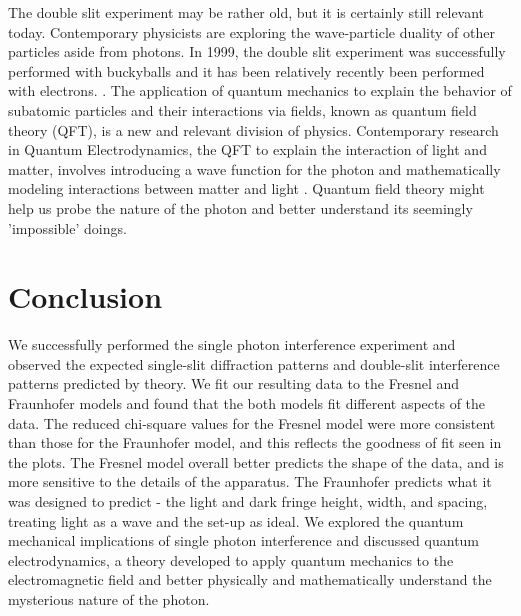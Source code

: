 \documentclass[prb,preprint]{revtex4-1}
\begin{document}
The double slit experiment may be rather old, but it is certainly still relevant today.  Contemporary physicists are exploring the wave-particle duality of other particles aside from photons.  In 1999, the double slit experiment was successfully performed with buckyballs and it has been relatively recently been performed with electrons.   \cite{bucky}.  The application of quantum mechanics to explain the behavior of subatomic particles and their interactions via fields, known as quantum field theory (QFT), is a new and relevant division of physics.  Contemporary research in Quantum Electrodynamics, the QFT to explain the interaction of light and matter, involves introducing a wave function for the photon and mathematically modeling interactions between matter and light \cite{iwo}.  Quantum field theory might help us probe the nature of the photon and better understand its seemingly 'impossible' doings.

\section{Conclusion}

We successfully performed the single photon interference experiment and observed the expected single-slit diffraction patterns and double-slit interference patterns predicted by theory.  We fit our resulting data to the Fresnel and Fraunhofer models and found that the both models fit different aspects of the data.  The reduced chi-square values for the Fresnel model were more consistent than those for the Fraunhofer model, and this reflects the goodness of fit seen in the plots.  The Fresnel model overall better predicts the shape of the data, and is more sensitive to the details of the apparatus.  The Fraunhofer predicts what it was designed to predict - the light and dark fringe height, width, and spacing, treating light as a wave and the set-up as ideal.  We explored the quantum mechanical implications of single photon interference and discussed quantum electrodynamics, a theory developed to apply quantum mechanics to the electromagnetic field and better physically and mathematically understand the mysterious nature of the photon.
\end{document}

